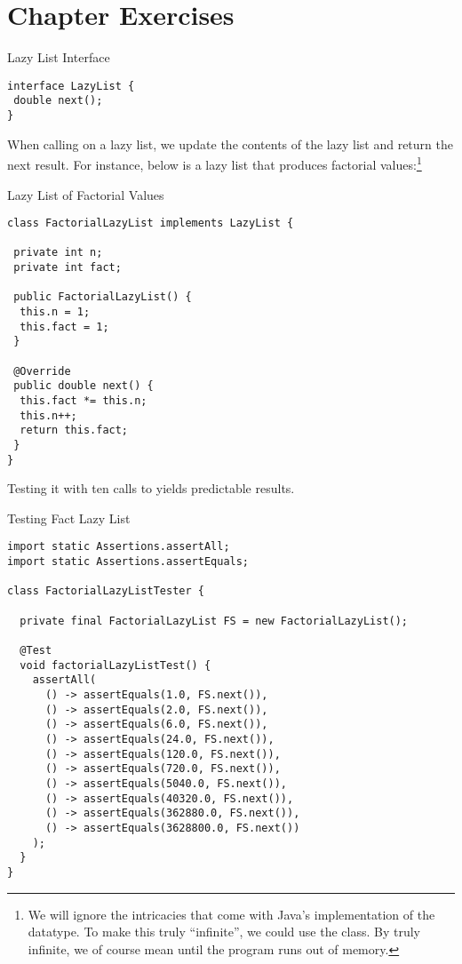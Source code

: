\section*{Chapter Exercises}


\begin{cl}{Lazy List Interface}
\begin{lstlisting}[language=MyJava]
interface LazyList {
 double next();
}
\end{lstlisting}
\end{cl}

When calling  on a lazy list, we update the contents of the lazy list and return the next result. For instance, below is a lazy list that produces factorial values:\footnote{We will ignore the intricacies that come with Java's implementation of the  datatype. To make this truly ``infinite'', we could use the  class. By truly infinite, we of course mean until the program runs out of memory.}

\begin{cl}{Lazy List of Factorial Values}
\begin{lstlisting}[language=MyJava]
class FactorialLazyList implements LazyList {

 private int n;
 private int fact;
 
 public FactorialLazyList() {
  this.n = 1;
  this.fact = 1;
 }

 @Override
 public double next() {
  this.fact *= this.n;
  this.n++;
  return this.fact;
 }
}
\end{lstlisting}
\end{cl}

Testing it with ten calls to  yields predictable results.

\begin{cl}{Testing Fact Lazy List}
\begin{lstlisting}[language=MyJava]
import static Assertions.assertAll;
import static Assertions.assertEquals;

class FactorialLazyListTester {

  private final FactorialLazyList FS = new FactorialLazyList();

  @Test
  void factorialLazyListTest() {
    assertAll(
      () -> assertEquals(1.0, FS.next()),
      () -> assertEquals(2.0, FS.next()),
      () -> assertEquals(6.0, FS.next()),
      () -> assertEquals(24.0, FS.next()),
      () -> assertEquals(120.0, FS.next()),
      () -> assertEquals(720.0, FS.next()),
      () -> assertEquals(5040.0, FS.next()),
      () -> assertEquals(40320.0, FS.next()),
      () -> assertEquals(362880.0, FS.next()),
      () -> assertEquals(3628800.0, FS.next())
    );
  }
}
\end{lstlisting}
\end{cl}

